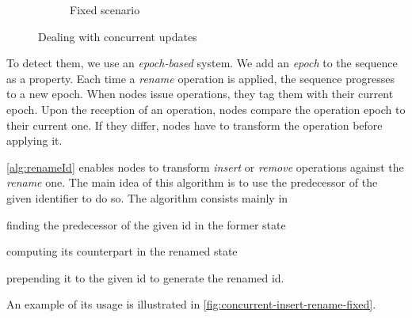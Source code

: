 \documentclass[sigplan,10pt,authorversion]{acmart}
\newcommand{\widthletter}{7mm}
\begin{document}
\begin{figure}[ht!]
\begin{subfigure}{\columnwidth}
        \caption{Fixed scenario}
        \label{fig:concurrent-insert-rename-fixed}
    \end{subfigure}
    \caption{Dealing with concurrent updates}
    \label{fig:concurrent-insert-rename}
\end{figure}

To detect them, we use an \emph{epoch-based} system.
We add an \emph{epoch} to the sequence as a property.
Each time a \emph{rename} operation is applied, the sequence progresses to a new epoch.
When nodes issue operations, they tag them with their current epoch.
Upon the reception of an operation, nodes compare the operation epoch to their current one.
If they differ, nodes have to transform the operation before applying it.

\autoref{alg:renameId} enables nodes to transform \emph{insert} or \emph{remove} operations against the \emph{rename} one.
The main idea of this algorithm is to use the predecessor of the given identifier to do so.
The algorithm consists mainly in
\begin{enumerate*}
    \item finding the predecessor of the given id in the former state
    \item computing its counterpart in the renamed state
    \item prepending it to the given id to generate the renamed id.
\end{enumerate*}
An example of its usage is illustrated in \autoref{fig:concurrent-insert-rename-fixed}.
\end{document}
